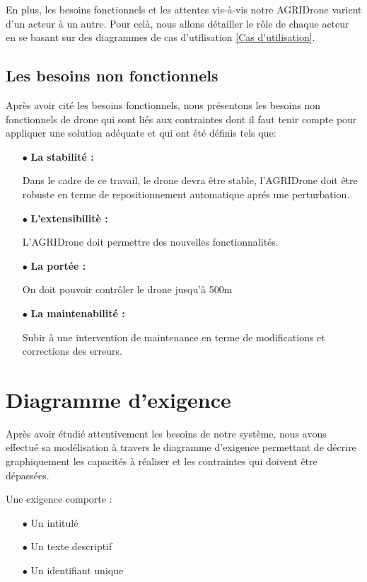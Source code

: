 En plus, les besoins fonctionnels et les attentes vis-à-vis notre AGRIDrone varient d'un acteur à un autre. Pour celà, nous allons détailler le rôle de chaque acteur en se basant sur des diagrammes de cas d'utilisation \ref{Cas d'utilisation}.

\subsection{Les besoins non fonctionnels}
Après avoir cité les besoins fonctionnels, nous présentons
les besoins non fonctionnels de drone qui sont liés aux contraintes dont il faut tenir compte pour appliquer une solution adéquate et qui ont été définis tels que:
\begin{itemize}
	\item [$\bullet$] \textbf{La stabilité :}
	
	
	Dans le cadre de ce travail, le drone devra être stable, l'AGRIDrone doit être robuste en terme de repositionnement automatique aprés une perturbation.	
	
	\item [$\bullet$] \textbf{L'extensibilitè : }
	
	
	L'AGRIDrone doit permettre des nouvelles fonctionnalités.
	
	\item [$\bullet$] \textbf{La portée : } 
	
	
	On doit pouvoir contrôler le drone jusqu'à 500m
	
	
	\item [$\bullet$] \textbf{La maintenabilité : }  
	
	Subir à une intervention de maintenance en terme de modifications et corrections des erreurs.
	\end {itemize}
	\clearpage
	\section{Diagramme d'exigence }
	Après avoir étudié attentivement les besoins de  notre système, nous avons effectué sa modélisation à travers le diagramme d'exigence permettant de décrire graphiquement les capacités à réaliser et les contraintes qui doivent être dépassées.
	
	Une exigence comporte : 
	\begin{itemize}
		\item [$\bullet$] Un intitulé 
		
		\item [$\bullet$]Un texte descriptif 
		
		\item [$\bullet$]Un identifiant unique
	\end{itemize}
	
